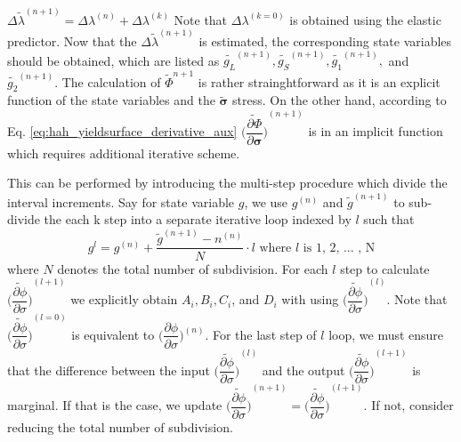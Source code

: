 \documentclass[12pt]{amsart}
\begin{document}
$\Delta\tilde{\lambda}^{(n+1)}=\Delta\lambda^{(n)}+\Delta\lambda^{(k)}$
Note that $\Delta\lambda^{(k=0)}$ is obtained using the elastic predictor.
Now that the $\Delta\tilde{\lambda}^{(n+1)}$ is estimated, the corresponding state variables should be obtained, which are listed as $\tilde{g_L}^{(n+1)}, \tilde{g_S}^{(n+1)}, \tilde{g_1}^{(n+1)},$ and $\tilde{g_2}^{(n+1)}$.
The calculation of $\tilde{\Phi}^{n+1}$ is rather strainghtforward as it is an explicit function of the state variables and the $\tilde{\mathbf{\sigma}}$ stress.
On the other hand, according to Eq. \ref{eq:hah_yieldsurface_derivative_aux} $\tilde{\bigg(\dfrac{\partial\Phi}{\partial\mathbf{\sigma}}\bigg)}^{(n+1)}$ is in an implicit function which requires additional iterative scheme.

This can be performed by introducing the multi-step procedure which divide the interval increments.
Say for state variable $g$, we use $g^{(n)}$ and $\tilde{g}^{(n+1)}$ to sub-divide the each k step into a separate iterative loop indexed by $l$ such that
\begin{equation}
  \label{eq:g_subdivision}
  g^{l}=g^{(n)}+\frac{\tilde{g}^{(n+1)}-n^{(n)}}{N}\cdot l \text{  where } l \text{ is 1, 2, ... , N}
\end{equation}
where $N$ denotes the total number of subdivision.
For each $l$ step to calculate $\tilde{\bigg(\dfrac{\partial\phi}{\partial\sigma}\bigg)}^{(l+1)}$ we explicitly obtain $A_i, B_i, C_i$, and $D_i$ with using $\tilde{\bigg(\dfrac{\partial\phi}{\partial\sigma}\bigg)}^{(l)}$.
Note that $\tilde{\bigg(\dfrac{\partial\phi}{\partial\sigma}\bigg)}^{(l=0)}$ is equivalent to $\bigg(\dfrac{\partial\phi}{\partial\sigma}\bigg)^{(n)}$.
For the last step of $l$ loop, we must ensure that the difference between the input $\tilde{\bigg(\dfrac{\partial\phi}{\partial\sigma}\bigg)}^{(l)}$ and the output $\tilde{\bigg(\dfrac{\partial\phi}{\partial\sigma}\bigg)}^{(l+1)}$ is marginal.
If that is the case, we update $\tilde{\bigg(\dfrac{\partial\phi}{\partial\sigma}\bigg)}^{(n+1)}=\tilde{\bigg(\dfrac{\partial\phi}{\partial\sigma}\bigg)}^{(l+1)}$.
If not, consider reducing the total number of subdivision.
\end{document}
